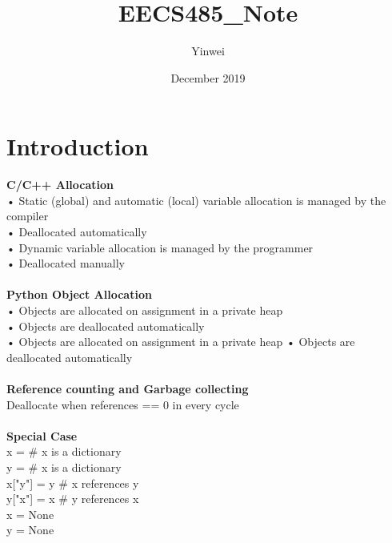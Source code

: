 \documentclass{article}
\title{EECS485_Note}
\author{Yinwei}
\date{December 2019}
\begin{document}
\maketitle

\section{Introduction}
\large{\textbf{C/C++ Allocation}}\\
• Static (global) and automatic
(local) variable allocation is
managed by the compiler\\
• Deallocated automatically\\
• Dynamic variable allocation is
managed by the programmer\\
• Deallocated manually\\ \\ 
\large{\textbf{Python Object Allocation}}\\
• Objects are allocated on
assignment in a private heap\\
• Objects are deallocated
automatically\\• Objects are allocated on
assignment in a private heap
• Objects are deallocated
automatically\\ \\ 
\large{\textbf{Reference counting and Garbage collecting}} \\
Deallocate when references  == 0 in every cycle\\ \\ 
\textbf{Special Case}\\
x = {} # x is a dictionary\\
y = {} # x is a dictionary\\
x["y"] = y # x references y\\
y["x"] = x # y references x\\
x = None\\
y = None
\end{document}
